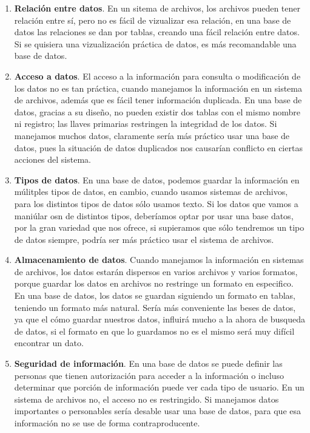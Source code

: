 \documentclass[
	10pt, %
	spanish %
]{fphw}
\begin{document}
\begin{enumerate}
	\item {\bf{Relación entre datos}}. En un sitema de archivos, los archivos pueden tener relación entre sí, pero no es fácil de vizualizar esa relación, en una base de datos las relaciones se dan por tablas, creando una fácil relación entre datos. Si se quisiera una vizualización práctica de datos, es más recomandable una base de datos.
	\item {\bf{Acceso a datos}}. El acceso a la información para consulta o modificación de los datos no es tan práctica, cuando manejamos la información en un sistema de archivos, además que es fácil tener información duplicada. En una base de datos, gracias a su diseño, no pueden existir dos tablas con el mismo nombre ni registro; las llaves primarias restringen la integridad de los datos. Si manejamos muchos datos, claramente sería más práctico usar una base de datos, pues la situación de datos duplicados nos causarían conflicto en ciertas acciones del sistema. 
	\item {\bf{Tipos de datos}}. En una base de datos, podemos guardar la información en múlitples tipos de datos, en cambio, cuando usamos sistemas de archivos, para los distintos tipos de datos sólo usamos texto. 
	Si los datos que vamos a maniúlar osn de distintos tipos, deberíamos optar por usar una base datos, por la gran variedad que nos ofrece, si supieramos que sólo tendremos un tipo de datos siempre, podría ser más práctico usar el sistema de archivos.
	\item {\bf{Almacenamiento de datos}}. Cuando manejamos la información en sistemas de archivos, los datos estarán dispersos en varios archivos y varios formatos, porque guardar los datos en archivos no restringe un formato en especifico. En una base de datos, los datos se guardan siguiendo un formato en tablas, teniendo un formato más natural. Sería más conveniente las beses de datos, ya que el cómo guardar nuestros datos, influirá mucho a la ahora de busqueda de datos, si el formato en que lo guardamos no es el mismo será muy difícil encontrar un dato.
	\item {\bf{Seguridad de información}}. En una base de datos se puede definir las personas que tienen autorización para acceder a la información o incluso determinar que porción de información puede ver cada tipo de usuario. En un sistema de archivos no, el acceso no es restringido. Si manejamos datos importantes o personables sería desable usar una base de datos, para que esa información no se use de forma contraproducente.    	
\end{enumerate}
\end{document}
